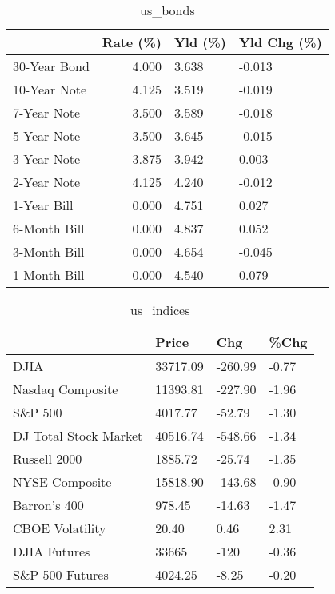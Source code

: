 \documentclass{article}%
\begin{document}
\begin{table}[htbp]%
\caption{us\_bonds}%
\centering%
\begin{adjustbox}{width=1\textwidth}%
\begin{tabular}{lrll}
\toprule
             &  Rate (\%) & Yld (\%) & Yld Chg (\%) \\
\midrule
30-Year Bond &     4.000 &   3.638 &      -0.013 \\
10-Year Note &     4.125 &   3.519 &      -0.019 \\
 7-Year Note &     3.500 &   3.589 &      -0.018 \\
 5-Year Note &     3.500 &   3.645 &      -0.015 \\
 3-Year Note &     3.875 &   3.942 &       0.003 \\
 2-Year Note &     4.125 &   4.240 &      -0.012 \\
 1-Year Bill &     0.000 &   4.751 &       0.027 \\
6-Month Bill &     0.000 &   4.837 &       0.052 \\
3-Month Bill &     0.000 &   4.654 &      -0.045 \\
1-Month Bill &     0.000 &   4.540 &       0.079 \\
\bottomrule
\end{tabular}
%
\end{adjustbox}%
\end{table}

%


\begin{table}[htbp]%
\caption{us\_indices}%
\centering%
\begin{adjustbox}{width=1\textwidth}%
\begin{tabular}{llll}
\toprule
                      &    Price &     Chg &  \%Chg \\
\midrule
                 DJIA & 33717.09 & -260.99 & -0.77 \\
     Nasdaq Composite & 11393.81 & -227.90 & -1.96 \\
              S\&P 500 &  4017.77 &  -52.79 & -1.30 \\
DJ Total Stock Market & 40516.74 & -548.66 & -1.34 \\
         Russell 2000 &  1885.72 &  -25.74 & -1.35 \\
       NYSE Composite & 15818.90 & -143.68 & -0.90 \\
         Barron's 400 &   978.45 &  -14.63 & -1.47 \\
      CBOE Volatility &    20.40 &    0.46 &  2.31 \\
         DJIA Futures &    33665 &    -120 & -0.36 \\
      S\&P 500 Futures &  4024.25 &   -8.25 & -0.20 \\
\bottomrule
\end{tabular}
%
\end{adjustbox}%
\end{table}
\end{document}
